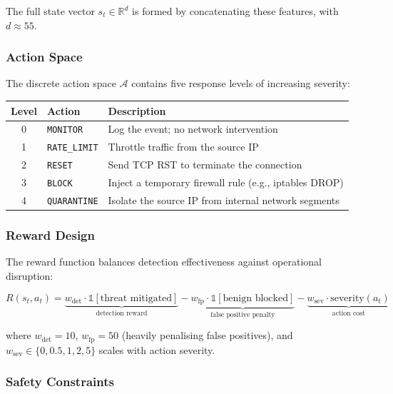 \documentclass[12pt,a4paper]{article}
\theoremstyle{definition}
\begin{document}
The full state vector $s_t \in \mathbb{R}^{d}$ is formed by concatenating these features, with $d \approx 55$.

\subsubsection{Action Space}

The discrete action space $\mathcal{A}$ contains five response levels of increasing severity:

\begin{center}
\begin{tabular}{clp{6cm}}
\toprule
Level & Action & Description \\
\midrule
0 & \texttt{MONITOR} & Log the event; no network intervention \\
1 & \texttt{RATE\_LIMIT} & Throttle traffic from the source IP \\
2 & \texttt{RESET} & Send TCP RST to terminate the connection \\
3 & \texttt{BLOCK} & Inject a temporary firewall rule (e.g., iptables DROP) \\
4 & \texttt{QUARANTINE} & Isolate the source IP from internal network segments \\
\bottomrule
\end{tabular}
\end{center}

\subsubsection{Reward Design}

The reward function balances detection effectiveness against operational disruption:

\begin{equation}
R(s_t, a_t) = \underbrace{w_{\text{det}} \cdot \mathbb{1}[\text{threat mitigated}]}_{\text{detection reward}}
- \underbrace{w_{\text{fp}} \cdot \mathbb{1}[\text{benign blocked}]}_{\text{false positive penalty}}
- \underbrace{w_{\text{sev}} \cdot \text{severity}(a_t)}_{\text{action cost}}
\label{eq:reward}
\end{equation}

where $w_{\text{det}} = 10$, $w_{\text{fp}} = 50$ (heavily penalising false positives), and $w_{\text{sev}} \in \{0, 0.5, 1, 2, 5\}$ scales with action severity.

\subsubsection{Safety Constraints}
\end{document}
